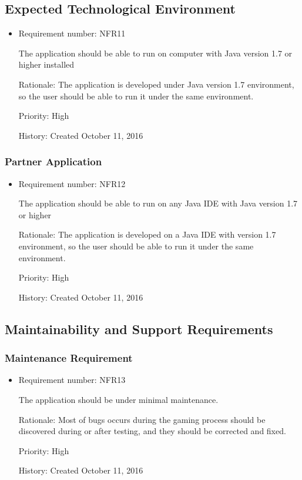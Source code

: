 \documentclass[12pt,letterpaper]{article}
\begin{document}
\subsection{Expected Technological Environment}
\begin{itemize}
	\item Requirement number: NFR11

	The application should be able to run on computer with Java version 1.7 or higher installed

	Rationale: The application is developed under Java version 1.7 environment, so the user should be able to run it under the same environment. 

	Priority: High

	History: Created October 11, 2016
\end{itemize}
\subsubsection{Partner Application}
\begin{itemize}
	\item Requirement number: NFR12

	The application should be able to run on any Java IDE with Java version 1.7 or higher

	Rationale: The application is developed on a Java IDE with version 1.7 environment, so the user should be able to run it under the same environment. 

	Priority: High

	History: Created October 11, 2016
\end{itemize}
\subsection{Maintainability and Support Requirements}
\subsubsection{Maintenance Requirement}
\begin{itemize}
	\item Requirement number: NFR13

	The application should be under minimal maintenance.

	Rationale: Most of bugs occurs during the gaming process should be discovered during or after testing, and they should be corrected and fixed.

	Priority: High

	History: Created October 11, 2016
\end{itemize}
\end{document}
